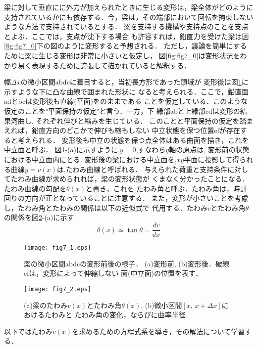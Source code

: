 \documentclass[10pt,a4j]{jarticle}
\begin{document}
梁に対して垂直にに外力が加えられたときに生じる変形は，梁全体がどのように
支持されているかにも依存する．今，梁は，その端部において回転を拘束しない
ような方法で支持されているとする．
梁を支持する機構や支持点のことを支点とよぶ．ここでは，支点が沈下する場合
も許容すれば，鉛直力を受けた梁は図\ref{fig:fig7_0}下の図のように変形すると予想される．
ただし，議論を簡単にするために梁に生じる変形は非常に小さいと仮定し，
図\ref{fig:fig7_0}は変形状況をわかり易く表現するために誇張して描かれていると解釈する．


幅$\Delta x$の微小区間abdcに着目すると，当初長方形であった領域が
変形後は図\ref{fig:fig7_1}に示すような下に凸な曲線で囲まれた形状に
なると考えられる．ここで，鉛直面adとbcは変形後も直線(平面)をのままである
ことを仮定している．このような仮定のことを"平面保持の仮定"と言う．一方，下
縁部abと上縁部cdは変形の結果湾曲し, それぞれ伸びと縮みを生じている．
このことと平面保持の仮定を踏まえれば，鉛直方向のどこかで伸びも縮もしない
中立状態を保つ位置efが存在すると考えられる．
変形後も中立の状態を保つ点全体はある曲面を描き，これを中立面と呼ぶ．
図\ref{fig:fig7_1}-(a)に示すように,$y=0$,すなわち$y$軸の原点は,
変形前の状態における中立面内にとる.
変形後の梁における中立面を,$xy$平面に投影して得られる曲線$y=v(x)$は,たわみ曲線と呼ばれる．
与えられた荷重と支持条件に対してたわみ曲線が求められれば，梁の変形状態が
くまなく分かったことになる．たわみ曲線の勾配を$\theta(x)$と書き，これを
たわみ角と呼ぶ．たわみ角は，時計回りの方向が正となっていることに注意する．
また，変形が小さいことを考慮し，たわみ角とたわみの関係は以下の近似式で
代用する．たわみ$v$とたわみ角$\theta$の関係を図\ref{fig:fig7_2}-(a)に示す.
\begin{equation}
	\theta(x) \simeq \tan \theta =\frac{dv}{dx}
	\label{eqn:th_apprx}
\end{equation}
\begin{figure}
	\begin{center}
	\texttt{[image: fig7\_1.eps]} 
	\end{center}
	\caption{
		梁の微小区間abdcの変形前後の様子．
		(a)変形前, (b)変形後．破線efは，変形によって伸縮しない
		面(中立面)の位置を表す．
	} 
	\label{fig:fig7_1}
\end{figure}
\begin{figure}
	\begin{center}
	\texttt{[image: fig7\_2.eps]} 
	\end{center}
	\caption{
	(a)梁のたわみ$v(x)$とたわみ角$\theta(x)$. 
	(b)微小区間$\left[x, \, x+\Delta x \right]$におけるたわみと
	たわみ角の変化，ならびに曲率半径.
	 } 
	\label{fig:fig7_2}
\end{figure}
以下ではたわみ$v(x)$を求めるための方程式系を導き，その解法について学習する．
\end{document}
